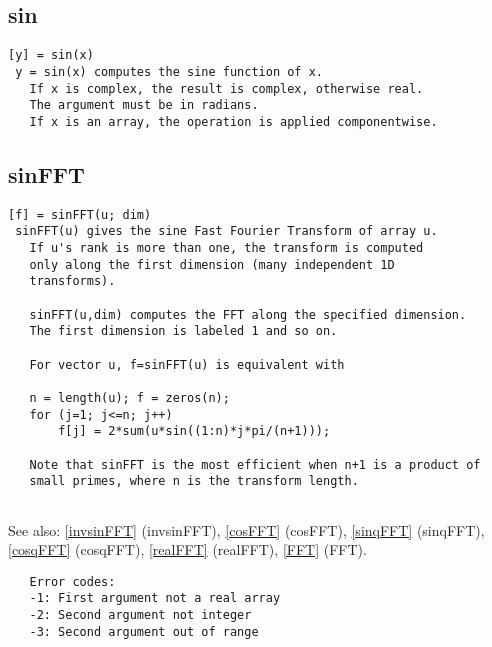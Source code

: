 \documentclass[a4paper]{article}
\begin{document}
\subsection{sin\label{sin}}

\begin{tscreen}
\begin{verbatim}
[y] = sin(x)
 y = sin(x) computes the sine function of x.
   If x is complex, the result is complex, otherwise real.
   The argument must be in radians.
   If x is an array, the operation is applied componentwise.
\end{verbatim}
\end{tscreen}





\subsection{sinFFT\label{sinFFT}}

\begin{tscreen}
\begin{verbatim}
[f] = sinFFT(u; dim)
 sinFFT(u) gives the sine Fast Fourier Transform of array u.
   If u's rank is more than one, the transform is computed
   only along the first dimension (many independent 1D
   transforms).

   sinFFT(u,dim) computes the FFT along the specified dimension.
   The first dimension is labeled 1 and so on.

   For vector u, f=sinFFT(u) is equivalent with

   n = length(u); f = zeros(n);
   for (j=1; j<=n; j++)
       f[j] = 2*sum(u*sin((1:n)*j*pi/(n+1)));

   Note that sinFFT is the most efficient when n+1 is a product of
   small primes, where n is the transform length.
           
\end{verbatim}

See also: \ref{invsinFFT} {(invsinFFT)}, \ref{cosFFT} {(cosFFT)}, \ref{sinqFFT} {(sinqFFT)}, \ref{cosqFFT} {(cosqFFT)}, \ref{realFFT} {(realFFT)}, \ref{FFT} {(FFT)}.
\begin{verbatim}
   Error codes:
   -1: First argument not a real array
   -2: Second argument not integer
   -3: Second argument out of range
   
\end{verbatim}
\end{tscreen}
\end{document}
